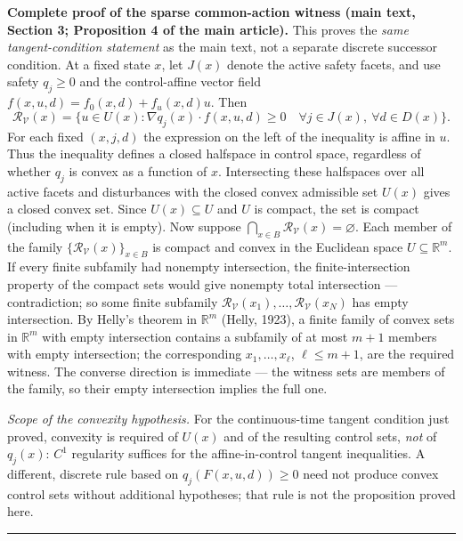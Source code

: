 \documentclass[11pt]{article}
\theoremstyle{definition}
\begin{document}
\bigskip
\noindent\textbf{Complete proof of the sparse common-action witness
(main text, Section 3; Proposition 4 of the main article).}
This proves the \emph{same tangent-condition statement} as the main
text, not a separate discrete successor condition. At a fixed state
\(x\), let \(J(x)\) denote the active safety facets, and use safety
\(q_j\ge0\) and the control-affine vector field
\(f(x,u,d)=f_0(x,d)+f_u(x,d)u\). Then
\[\mathcal R_{\mathcal V}(x)=\{u\in U(x):
\nabla q_j(x)\cdot f(x,u,d)\ge0\quad
\forall j\in J(x),\ \forall d\in D(x)\}.\]
For each fixed \((x,j,d)\) the expression on the left of the
inequality is affine in \(u\). Thus the inequality defines a closed
halfspace in control space, regardless of whether \(q_j\) is convex
as a function of \(x\). Intersecting these halfspaces over all active
facets and disturbances with the closed convex admissible set \(U(x)\)
gives a closed convex set. Since \(U(x)\subseteq U\) and \(U\) is
compact, the set is compact (including when it is empty). Now suppose
\(\bigcap_{x\in B}\mathcal R_{\mathcal V}(x)=\varnothing\).
Each member of the family \(\{\mathcal{R}_{\mathcal{V}}(x)\}_{x \in B}\)
is compact and convex in the Euclidean space \(U \subseteq
\mathbb{R}^{m}\). If every finite subfamily had nonempty intersection,
the finite-intersection property of the compact sets would give nonempty
total intersection --- contradiction; so some finite subfamily
\(\mathcal{R}_{\mathcal{V}}(x_{1}), \dots,
\mathcal{R}_{\mathcal{V}}(x_{N})\) has empty intersection. By Helly's
theorem in \(\mathbb{R}^{m}\) (Helly, 1923), a finite family of convex
sets in \(\mathbb{R}^{m}\) with empty intersection contains a
subfamily of at most \(m + 1\) members with empty intersection; the
corresponding \(x_{1}, \dots, x_{\ell}\), \(\ell \le m + 1\), are the
required witness. The converse direction is immediate --- the witness
sets are members of the family, so their empty intersection implies the
full one. \smallskip

\emph{Scope of the convexity hypothesis.} For the continuous-time
tangent condition just proved, convexity is required of \(U(x)\)
and of the resulting control sets, \emph{not} of \(q_j(x)\):
\(C^1\) regularity suffices for the affine-in-control tangent
inequalities. A different, discrete rule based on
\(q_j(F(x,u,d))\ge0\) need not produce convex control sets without
additional hypotheses; that rule is not the proposition proved here.
\rule{0.5\linewidth}{0.5pt}
\end{document}
